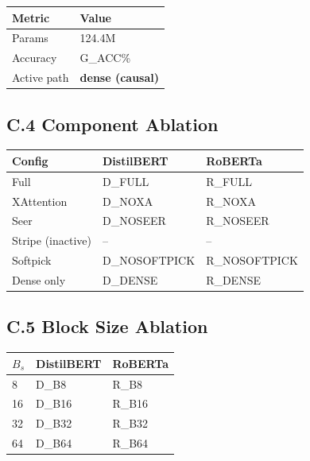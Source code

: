 \begin{table}[H]
\centering
\small
\begin{tabular}{ll}
\toprule
\textbf{Metric} & \textbf{Value} \\
\midrule
Params & 124.4M \\
Accuracy & {{G\_ACC}}\% \\
Active path & \textbf{dense (causal)} \\
\bottomrule
\end{tabular}
\end{table}

\subsection{C.4 Component Ablation}

\begin{table}[H]
\centering
\small
\begin{tabular}{lll}
\toprule
\textbf{Config} & \textbf{DistilBERT} & \textbf{RoBERTa} \\
\midrule
Full & {{D\_FULL}} & {{R\_FULL}} \\
XAttention & {{D\_NOXA}} & {{R\_NOXA}} \\
Seer & {{D\_NOSEER}} & {{R\_NOSEER}} \\
Stripe (inactive) & -- & -- \\
Softpick & {{D\_NOSOFTPICK}} & {{R\_NOSOFTPICK}} \\
Dense only & {{D\_DENSE}} & {{R\_DENSE}} \\
\bottomrule
\end{tabular}
\end{table}

\subsection{C.5 Block Size Ablation}

\begin{table}[H]
\centering
\small
\begin{tabular}{lll}
\toprule
\textbf{$B_s$} & \textbf{DistilBERT} & \textbf{RoBERTa} \\
\midrule
8 & {{D\_B8}} & {{R\_B8}} \\
16 & {{D\_B16}} & {{R\_B16}} \\
32 & {{D\_B32}} & {{R\_B32}} \\
64 & {{D\_B64}} & {{R\_B64}} \\
\bottomrule
\end{tabular}
\end{table}


